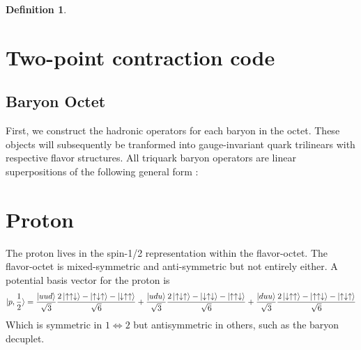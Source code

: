 \documentclass[prd,12pt,superscriptaddress,tightenlines,nofootinbib]{revtex4}
\theoremstyle{plain}
\theoremstyle{definition}
\newtheorem{defn}[thm]{Definition}
\theoremstyle{remark}
\begin{document}
\begin{defn}
\section{Two-point contraction code}
\subsection{Baryon Octet}
First, we construct the hadronic operators for each baryon in the octet. These objects will subsequently be 
tranformed into gauge-invariant quark trilinears with respective flavor structures. All triquark baryon operators are
linear superpositions of the following general form :



\section{Proton}

The proton lives in the spin-1/2 representation within the flavor-octet. The flavor-octet is mixed-symmetric 
and anti-symmetric but not entirely either. 
A potential basis vector for the proton is 
\begin{align}
	\ket{p,\frac{1}{2}} = \frac{\ket{uud}}{\sqrt{3}} \frac{2 \ket{\uparrow\uparrow\downarrow}- \ket{\uparrow\downarrow\uparrow}- \ket{\downarrow\uparrow\uparrow}}{\sqrt{6}} +
	\frac{\ket{udu}}{\sqrt{3}} \frac{2 \ket{\uparrow\downarrow\uparrow}- \ket{\downarrow\uparrow\downarrow}- \ket{\uparrow\uparrow\downarrow}}{\sqrt{6}} +
	\frac{\ket{duu}}{\sqrt{3}} \frac{2 \ket{\downarrow\uparrow\uparrow}- \ket{\uparrow\uparrow\downarrow}- \ket{\uparrow\downarrow\uparrow}}{\sqrt{6}}
\end{align}
Which is symmetric in $1\Leftrightarrow 2$ but antisymmetric in others, such as the baryon decuplet. 



\end{defn}
\end{document}
